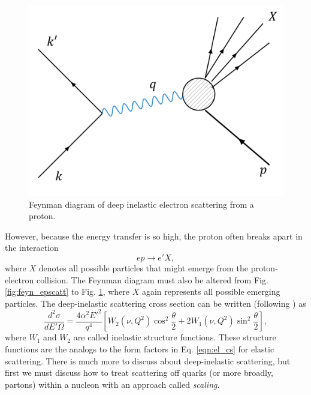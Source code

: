 \begin{figure}[h!]
	\centering
	\includegraphics[width=0.6\linewidth]{figures/feyn_inelscatt.png}
	\caption{Feynman diagram of deep inelastic electron scattering from a proton.}
	\label{fig:feyn_inelscatt}
\end{figure}

\newpage
However, because the energy transfer is so high, the proton often breaks apart in the interaction
\begin{equation}
ep \longrightarrow e'X,
\end{equation}
where $X$ denotes all possible particles that might emerge from the proton-electron collision. The Feynman diagram must also be altered from Fig. \ref{fig:feyn_epscatt} to Fig. \ref{fig:feyn_inelscatt}, where $X$ again represents all possible emerging particles. The deep-inelastic scattering cross section can be written (following \cite{book:halzen}) as
\begin{equation}
\frac{d^2\sigma}{dE'\Omega} = \frac{4\alpha^2E'^2}{q^4} \left[ W_2(\nu,Q^2)\cos^2\frac{\theta}{2} +2W_1(\nu,Q^2) \sin^2 \frac{\theta}{2} \right],
\end{equation}
where $W_1$ and $W_2$ are called inelastic structure functions. These structure functions are the analogs to the form factors in Eq. \ref{eqn:el_cs} for elastic scattering. There is much more to discuss about deep-inelastic scattering, but first we must discuss how to treat scattering off quarks (or more broadly, partons) within a nucleon with an approach called \textit{scaling}.

